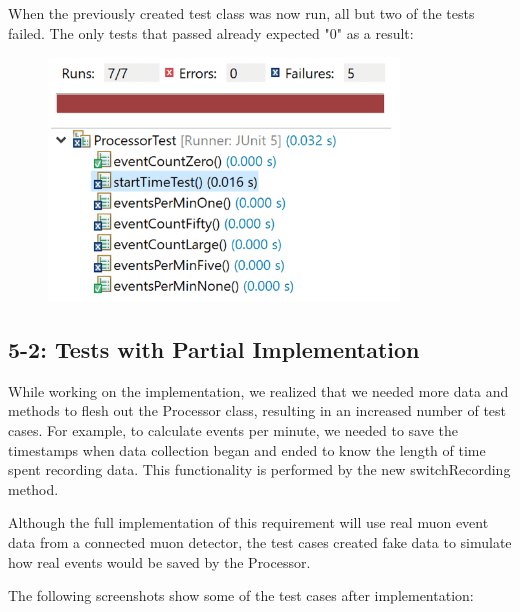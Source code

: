 \documentclass[11pt,a4paper]{article}
\begin{document}
When the previously created test class was now run, all but two of the tests failed. The only tests that passed already expected "0" as a result:

\begin{figure}[h]
	\includegraphics[width=0.83\textwidth]{codeimg3.png}
	\end{figure}
	
\newpage
\subsection*{5-2: Tests with Partial Implementation}

While working on the implementation, we realized that we needed more data and methods to flesh out the Processor class, resulting in an increased number of test cases. For example, to calculate events per minute, we needed to save the timestamps when data collection began and ended to know the length of time spent recording data. This functionality is performed by the new switchRecording method.
 
Although the full implementation of this requirement will use real muon event data from a connected muon detector, the test cases created fake data to simulate how real events would be saved by the Processor.

The following screenshots show some of the test cases after implementation:
\end{document}
